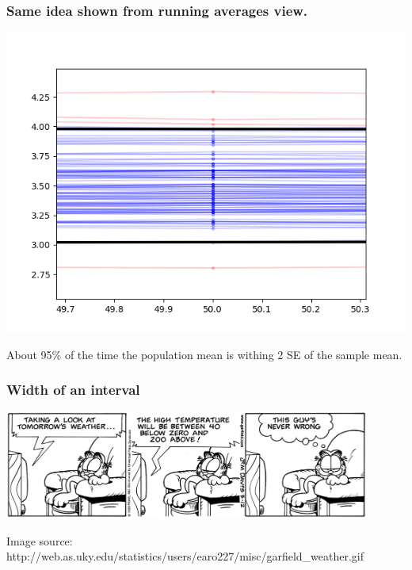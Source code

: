 

\begin{frame}
\frametitle{Same idea shown from running averages view.}
\includegraphics[scale=0.5]{4-2_conf_int/figures/run/zoomed2.png}

About 95\% of the time the population mean is withing 2 SE of the sample mean.
\end{frame}








\begin{frame}
\frametitle{Width of an interval}


\pause


\pause

\begin{center}
\includegraphics[width=0.9\textwidth]{4-2_conf_int/figures/garfield}
\end{center}

\pause

{\scriptsize Image source: http://web.as.uky.edu/statistics/users/earo227/misc/garfield\_weather.gif}
\end{frame}



